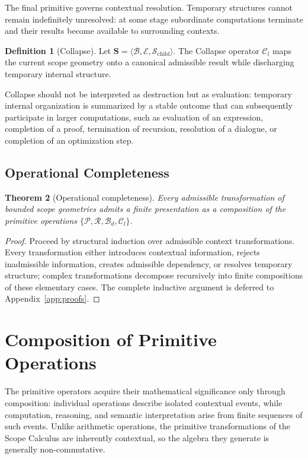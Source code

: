 \documentclass[11pt,twoside,openright]{book}
\numberwithin{equation}{chapter}
\theoremstyle{definition}
\newtheorem{definition}{Definition}[chapter]
\theoremstyle{plain}
\newtheorem{theorem}[definition]{Theorem}
\theoremstyle{remark}
\theoremstyle{definition}
\newcommand{\Scope}{\mathbf{S}}
\newcommand{\Pop}{\mathcal{P}}
\newcommand{\Refuse}{\mathcal{R}}
\newcommand{\Bind}{\mathcal{B}_d}
\newcommand{\Collapse}{\mathcal{C}_l}
\newcommand{\Boundary}{\mathcal{B}}
\newcommand{\Interior}{\mathcal{E}}
\newcommand{\Children}{\mathcal{S}_{\mathrm{child}}}
\begin{document}
The final primitive governs contextual resolution. Temporary structures
cannot remain indefinitely unresolved: at some stage subordinate
computations terminate and their results become available to surrounding
contexts.

\begin{definition}[Collapse]
Let $\Scope=\langle\Boundary,\Interior,\Children\rangle$. The Collapse
operator $\Collapse$ maps the current scope geometry onto a canonical
admissible result while discharging temporary internal structure.
\end{definition}

Collapse should not be interpreted as destruction but as evaluation:
temporary internal organization is summarized by a stable outcome that
can subsequently participate in larger computations, such as evaluation
of an expression, completion of a proof, termination of recursion,
resolution of a dialogue, or completion of an optimization step.

\subsection{Operational Completeness}

\begin{theorem}[Operational completeness]
\label{thm:operational-completeness}
Every admissible transformation of bounded scope geometries admits a
finite presentation as a composition of the primitive operations
$\{\Pop,\Refuse,\Bind,\Collapse\}$.
\end{theorem}

\begin{proof}
Proceed by structural induction over admissible context transformations.
Every transformation either introduces contextual information, rejects
inadmissible information, creates admissible dependency, or resolves
temporary structure; complex transformations decompose recursively into
finite compositions of these elementary cases. The complete inductive
argument is deferred to Appendix~\ref{app:proofs}.
\end{proof}

\section{Composition of Primitive Operations}

The primitive operators acquire their mathematical significance only
through composition: individual operations describe isolated contextual
events, while computation, reasoning, and semantic interpretation arise
from finite sequences of such events. Unlike arithmetic operations, the
primitive transformations of the Scope Calculus are inherently
contextual, so the algebra they generate is generally non-commutative.
\end{document}
